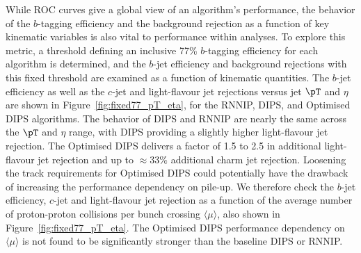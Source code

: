 While ROC curves give a global view of an algorithm's performance, the behavior of the $b$-tagging efficiency and the background rejection as a function of key kinematic variables is also vital to performance within analyses. 
To explore this metric, a threshold defining an inclusive 77\% $b$-tagging efficiency for each algorithm is determined, and the $b$-jet efficiency and background rejections with this fixed threshold are examined as a function of kinematic quantities. 
The $b$-jet efficiency as well as the $c$-jet and light-flavour jet rejections versus jet $\pT$ and $\eta$ are shown in Figure~\ref{fig:fixed77_pT_eta}, for the RNNIP, DIPS, and Optimised DIPS algorithms.  The behavior of DIPS and RNNIP are nearly the same across the $\pT$ and $\eta$ range, with DIPS providing a slightly higher light-flavour jet rejection. The Optimised DIPS delivers a factor of 1.5 to 2.5 in additional light-flavour jet rejection and up to $\approx33\%$ additional charm jet rejection. 
Loosening the track requirements for Optimised DIPS could potentially have the drawback of increasing the performance dependency on pile-up. 
We therefore check the $b$-jet efficiency, $c$-jet and light-flavour jet rejection as a function of the average number of proton-proton collisions per bunch crossing $\langle\mu\rangle$, also shown in Figure~\ref{fig:fixed77_pT_eta}. 
The Optimised DIPS performance dependency on $\langle\mu\rangle$ is not found to be significantly stronger than the baseline DIPS or RNNIP.


